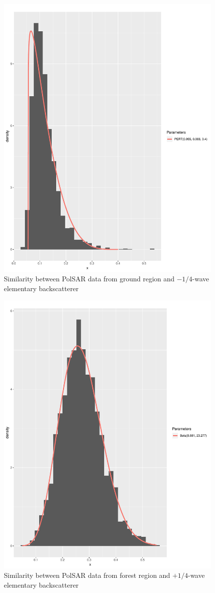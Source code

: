 \documentclass[conference]{IEEEtran}
\begin{document}
\begin{figure}[!ht]
    \centering
    \includegraphics[width = .9\linewidth, height = .7\linewidth]{../../../Figures/paper_19_05/wvn_ground.pdf}
    \caption{Similarity between PolSAR data from ground region and $-1/4$-wave elementary backscatterer}
    \label{fig:gr_wvn}
\end{figure}

\begin{figure}[!ht]
    \centering
    \includegraphics[width = .9\linewidth, height = .7\linewidth]{../../../Figures/paper_19_05/wvp_vegetation.pdf}
    \caption{Similarity between PolSAR data from forest region and $+1/4$-wave elementary backscatterer}
    \label{fig:fr_wvp}
\end{figure}
\end{document}
